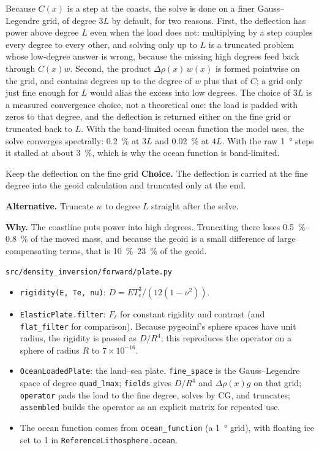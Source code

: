 Because $C(x)$ is a step at the coasts, the solve is done on a finer Gauss--Legendre grid, of degree $3L$ by default, for two reasons.
First, the deflection has power above degree $L$ even when the load does not: multiplying by a step couples every degree to every other, and solving only up to $L$ is a truncated problem whose low-degree answer is wrong, because the missing high degrees feed back through $C(x)w$.
Second, the product $\Delta\rho(x)\,w(x)$ is formed pointwise on the grid, and contains degrees up to the degree of $w$ plus that of $C$; a grid only just fine enough for $L$ would alias the excess into low degrees.
The choice of $3L$ is a measured convergence choice, not a theoretical one: the load is padded with zeros to that degree, and the deflection is returned either on the fine grid or truncated back to $L$.
With the band-limited ocean function the model uses, the solve converges spectrally: \qty{0.2}{\percent} at $3L$ and \qty{0.02}{\percent} at $4L$.
With the raw \qty{1}{\degree} steps it stalled at about \qty{3}{\percent}, which is why the ocean function is band-limited.

\begin{decision}{Keep the deflection on the fine grid}
\textbf{Choice.} The deflection is carried at the fine degree into the geoid calculation and truncated only at the end.

\textbf{Alternative.} Truncate $w$ to degree $L$ straight after the solve.

\textbf{Why.} The coastline puts power into high degrees.
Truncating there loses \qtyrange{0.5}{0.8}{\percent} of the moved mass, and because the geoid is a small difference of large compensating terms, that is \qtyrange{10}{23}{\percent} of the geoid.
\end{decision}

\begin{incode}{\texttt{src/density\_inversion/forward/plate.py}}
\begin{itemize}[nosep]
\item \texttt{rigidity(E, Te, nu)}: $D = E T_e^3/(12(1-\nu^2))$.
\item \texttt{ElasticPlate.filter}: $F_\ell$ for constant rigidity and contrast (and \texttt{flat\_filter} for comparison).
Because pygeoinf's sphere spaces have unit radius, the rigidity is passed as $D/R^4$; this reproduces the operator on a sphere of radius $R$ to $7\times10^{-16}$.
\item \texttt{OceanLoadedPlate}: the land--sea plate. \texttt{fine\_space} is the Gauss--Legendre space of degree \texttt{quad\_lmax}; \texttt{fields} gives $D/R^4$ and $\Delta\rho(x)g$ on that grid; \texttt{operator} pads the load to the fine degree, solves by CG, and truncates; \texttt{assembled} builds the operator as an explicit matrix for repeated use.
\item The ocean function comes from \texttt{ocean\_function} (a \qty{1}{\degree} grid), with floating ice set to 1 in \texttt{ReferenceLithosphere.ocean}.
\end{itemize}
\end{incode}
